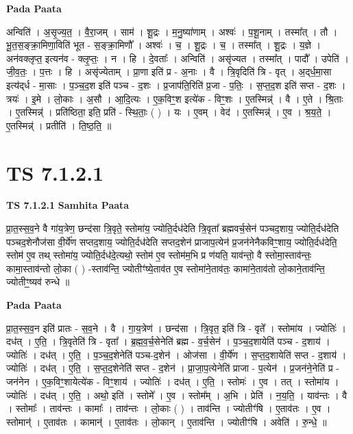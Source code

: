 \documentclass[17pt]{extarticle}
\begin{document}
\textbf{Pada Paata} \newline

अन्विति॑ । अ॒सृ॒ज्य॒त॒ । वै॒रा॒जम् । साम॑ । शू॒द्रः । म॒नु॒ष्या॑णाम् । अश्वः॑ । प॒शू॒नाम् । तस्मा᳚त् । तौ । भू॒त॒स॒ङ्क्रा॒मिणा॒विति॑ भूत - स॒ङ्क्रा॒मिणौ᳚ । अश्वः॑ । च॒ । शू॒द्रः । च॒ । तस्मा᳚त् । शू॒द्रः । य॒ज्ञे । अन॑वक्लृप्त॒ इत्यन॑व - क्लृ॒प्तः॒ । न । हि । दे॒वताः᳚ । अन्विति॑ । असृ॑ज्यत । तस्मा᳚त् । पादौ᳚ । उपेति॑ । जी॒व॒तः॒ । प॒त्तः । हि । असृ॑ज्येताम् । प्रा॒णा इति॑ प्र - अ॒नाः । वै । त्रि॒वृदिति॑ त्रि - वृत् । अ॒द्‌र्ध॒मा॒सा इत्य॑द्‌र्ध - मा॒साः । प॒ञ्च॒द॒श इति॑ पञ्च - द॒शः । प्र॒जाप॑ति॒रिति॑ प्र॒जा - प॒तिः॒ । स॒प्त॒द॒श इति॑ सप्त - द॒शः । त्रयः॑ । इ॒मे । लो॒काः । अ॒सौ । आ॒दि॒त्यः । ए॒क॒विꣳ॒॒श इत्ये॑क - विꣳ॒॒शः । ए॒तस्मिन्न्॑ । वै । ए॒ते । श्रि॒ताः । ए॒तस्मिन्न्॑ । प्रति॑ष्ठिता॒ इति॒ प्रति॑ - स्थि॒ताः॒ ( ) । यः । ए॒वम् । वेद॑ । ए॒तस्मिन्न्॑ । ए॒व । श्र॒य॒ते॒ । ए॒तस्मिन्न्॑ । प्रतीति॑ । ति॒ष्ठ॒ति॒ ॥  \newline





\section{ TS 7.1.2.1 }

\textbf{TS 7.1.2.1 } \newline
\textbf{Samhita Paata} \newline

प्रा॒त॒स्स॒व॒ने वै गा॑य॒त्रेण॒ छन्द॑सा त्रि॒वृते॒ स्तोमा॑य॒ ज्योति॒र्दध॑देति त्रि॒वृता᳚ ब्रह्मवर्च॒सेन॑ पञ्चद॒शाय॒ ज्योति॒र्दध॑देति पञ्चद॒शेनौज॑सा वी॒र्ये॑ण सप्तद॒शाय॒ ज्योति॒र्दध॑देति सप्तद॒शेन॑ प्राजाप॒त्येन॑ प्र॒जन॑नेनैकविꣳ॒॒शाय॒ ज्योति॒र्दध॑देति॒ स्तोम॑ ए॒व तथ् स्तोमा॑य॒ ज्योति॒र्दध॑दे॒त्यथो॒ स्तोम॑ ए॒व स्तोम॑म॒भि प्र ण॑यति॒ याव॑न्तो॒ वै स्तोमा॒स्ताव॑न्तः॒ कामा॒स्ताव॑न्तो लो॒का ( ) -स्ताव॑न्ति॒ ज्योतीꣳ॑ष्ये॒ताव॑त ए॒व स्तोमा॑ने॒ताव॑तः॒ कामा॑ने॒ताव॑तो लो॒काने॒ताव॑न्ति॒ ज्योतीꣳ॒॒ष्यव॑ रुन्धे ॥ \newline

\textbf{Pada Paata} \newline

प्रा॒त॒स्स॒व॒न इति॑ प्रातः - स॒व॒ने । वै । गा॒य॒त्रेण॑ । छन्द॑सा । त्रि॒वृत॒ इति॑ त्रि - वृते᳚ । स्तोमा॑य । ज्योतिः॑ । दध॑त् । ए॒ति॒ । त्रि॒वृतेति॑ त्रि - वृता᳚ । ब्र॒ह्म॒व॒र्च॒सेनेति॑ ब्रह्म - व॒र्च॒सेन॑ । प॒ञ्च॒द॒शायेति॑ पञ्च - द॒शाय॑ । ज्योतिः॑ । दध॑त् । ए॒ति॒ । प॒ञ्च॒द॒शेनेति॑ पञ्च-द॒शेन॑ । ओज॑सा । वी॒र्ये॑ण । स॒प्त॒द॒शायेति॑ सप्त - द॒शाय॑ । ज्योतिः॑ । दध॑त् । ए॒ति॒ । स॒प्त॒द॒शेनेति॑ सप्त - द॒शेन॑ । प्रा॒जा॒प॒त्येनेति॑ प्राजा - प॒त्येन॑ । प्र॒जन॑ने॒नेति॑ प्र - जन॑नेन । ए॒क॒विꣳ॒॒शायेत्ये॑क - विꣳ॒॒शाय॑ । ज्योतिः॑ । दध॑त् । ए॒ति॒ । स्तोमः॑ । ए॒व । तत् । स्तोमा॑य । ज्योतिः॑ । दध॑त् । ए॒ति॒ । अथो॒ इति॑ । स्तोमे᳚ । ए॒व । स्तोम᳚म् । अ॒भि । प्रेति॑ । न॒य॒ति॒ । याव॑न्तः । वै । स्तोमाः᳚ । ताव॑न्तः । कामाः᳚ । ताव॑न्तः । लो॒काः ( ) । ताव॑न्ति । ज्योतीꣳ॑षि । ए॒ताव॑तः । ए॒व । स्तोमान्॑ । ए॒ताव॑तः । कामान्॑ । ए॒ताव॑तः । लो॒कान् । ए॒ताव॑न्ति । ज्योतीꣳ॑षि । अवेति॑ । रु॒न्धे॒ ॥  \newline
\end{document}
